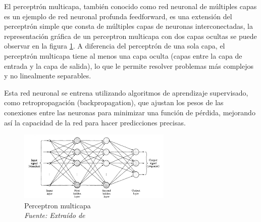 El perceptrón multicapa, también conocido como red neuronal de múltiples capas es un ejemplo de red neuronal profunda feedforward, es una extensión del perceptrón simple que consta de múltiples capas de neuronas interconectadas, la representación gráfica de un perceptron multicapa con dos capas ocultas se puede observar en la figura \ref{fig:an7}. A diferencia del perceptrón de una sola capa, el perceptrón multicapa tiene al menos una capa oculta (capas entre la capa de entrada y la capa de salida), lo que le permite resolver problemas más complejos y no linealmente separables.

Esta red neuronal se entrena utilizando algoritmos de aprendizaje supervisado, como retropropagación (backpropagation), que ajustan los pesos de las conexiones entre las neuronas para minimizar una función de pérdida, mejorando así la capacidad de la red para hacer predicciones precisas.

\begin{figure}[h!]
	\includegraphics[width=0.65\textwidth]{capitulo2/figuras/an7.png}
	\caption{Perceptron multicapa
		\\\textit{Fuente: Extraído de} \protect\cite[p.281]{haykin1998neural}}
	\label{fig:an7}
\end{figure}

